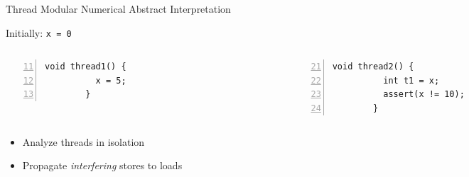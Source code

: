 \documentclass[t]{beamer}
\begin{document}
\begin{frame}[fragile,t]{Thread Modular Numerical Abstract Interpretation}
  \begin{center}
    Initially: \texttt{x = 0}
  \end{center}
  \begin{columns}
    \begin{column}{0.5\linewidth}
      \begin{lstlisting}[name=th01
                        , numbers=left
                        , firstnumber=11
                        , gobble=8]
        void thread1() {
          x = 5;
        }
      \end{lstlisting}
    \end{column}
    \begin{column}{0.5\linewidth}
      \begin{lstlisting}[name=th02
                        , numbers=left
                        , firstnumber=21
                        , gobble=8]
        void thread2() {
          int t1 = x;
          assert(x != 10);
        }
      \end{lstlisting}
    \end{column}
  \end{columns}
  \begin{center}
    \begin{itemize}
      \item<1-> Analyze threads in isolation
      \item<2-> Propagate \emph{interfering} stores to loads
    \end{itemize}
  \end{center}
\end{frame}
\end{document}
